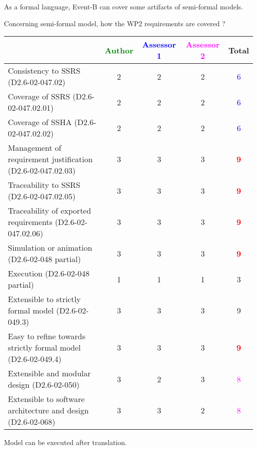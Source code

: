 \begin{author_comment}
As a formal language, Event-B  can cover some artifacts of semi-formal models.
\end{author_comment}

Concerning semi-formal model, how the WP2 requirements are covered ?

\begin{tabular}{|l | c | c | c | c|}
\hline
& \textcolor{green}{Author} & \textcolor{blue}{Assessor 1} & \textcolor{magenta}{Assessor 2} & Total \\
\hline 
Consistency to SSRS (D2.6-02-047.02) & 2    & 2    & 2    & \textcolor{blue}{6} \\
\hline
Coverage of SSRS (D2.6-02-047.02.01)  & 2    & 2    & 2    & \textcolor{blue}{6} \\
\hline
Coverage of SSHA (D2.6-02-047.02.02)  & 2    & 2    & 2    & \textcolor{blue}{6} \\
\hline
Management of requirement justification (D2.6-02-047.02.03)  & 3    & 3    & 3    & \textcolor{red}{\textbf{9}}  \\
\hline
Traceability to  SSRS (D2.6-02-047.02.05)  & 3    & 3    & 3    & \textcolor{red}{\textbf{9}} \\
\hline
Traceability of exported requirements (D2.6-02-047.02.06)  & 3    & 3    & 3    & \textcolor{red}{\textbf{9}} \\
\hline
Simulation or animation (D2.6-02-048 partial)  & 3    & 3    & 3    & \textcolor{red}{\textbf{9}} \\
\hline
Execution (D2.6-02-048 partial)  & 1    & 1    & 1    & 3    \\
\hline
Extensible to strictly formal model (D2.6-02-049.3) & 3    & 3    & 3    &  9 \\
\hline
Easy to  refine towards strictly formal model (D2.6-02-049.4) & 3    & 3    & 3    & \textcolor{red}{\textbf{9}} \\
\hline
Extensible and modular design (D2.6-02-050)  & 3    & 2    & 3    & \textcolor{magenta}{8}  \\
\hline
Extensible to software architecture and design (D2.6-02-068)   & 3    & 3    & 2    & \textcolor{magenta}{8} \\
\hline
\end{tabular}


\begin{author_comment}
Model can be executed after translation.
\end{author_comment}

